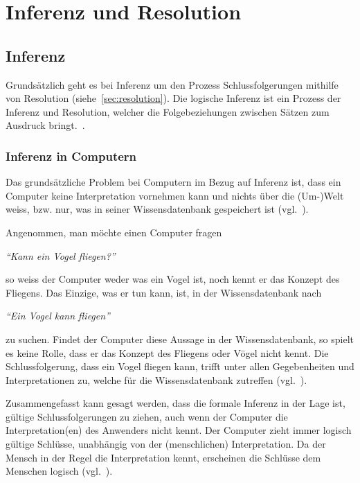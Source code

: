 \chapter{Inferenz und Resolution}
\label{chap:inferenz_resolution}

\section{Inferenz}
\label{sec:inferenz}
Grundsätzlich geht es bei Inferenz um den Prozess Schlussfolgerungen mithilfe von Resolution (siehe~\ref{sec:resolution}). Die logische Inferenz ist ein Prozess der Inferenz und Resolution, welcher die Folgebeziehungen zwischen Sätzen zum Ausdruck bringt.~\cite[S. 163]{russel}.

\subsection{Inferenz in Computern}
\label{subsec:inferenz-in-computer}

Das grundsätzliche Problem bei Computern im Bezug auf Inferenz ist, dass ein Computer keine Interpretation vornehmen kann und nichts über die (Um-)Welt weiss, bzw. nur, was in seiner Wissensdatenbank gespeichert ist (vgl.~\cite[S. 164]{russel}).

Angenommen, man möchte einen Computer fragen

    \noindent\hspace*{12mm}\textit{``Kann ein Vogel fliegen?''}

so weiss der Computer weder was ein Vogel ist, noch kennt er das Konzept des Fliegens. Das Einzige, was er tun kann, ist, in der Wissensdatenbank nach 

    \noindent\hspace*{12mm}\textit{``Ein Vogel kann fliegen''}

zu suchen. Findet der Computer diese Aussage in der Wissensdatenbank, so spielt es keine Rolle, dass er das Konzept des Fliegens oder Vögel nicht kennt. Die Schlussfolgerung, dass ein Vogel fliegen kann, trifft unter allen Gegebenheiten und Interpretationen zu, welche für die Wissensdatenbank zutreffen (vgl.~\cite[S.164]{russel}).

Zusammengefasst kann gesagt werden, dass die formale Inferenz in der Lage ist, gültige Schlussfolgerungen zu ziehen, auch wenn der Computer die Interpretation(en) des Anwenders nicht kennt. Der Computer zieht immer logisch gültige Schlüsse, unabhängig von der (menschlichen) Interpretation. Da der Mensch in der Regel die Interpretation kennt, erscheinen die Schlüsse dem Menschen logisch (vgl.~\cite[S. 165]{russel}).

